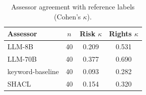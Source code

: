 \begin{table}[htbp]
\centering
\caption{Assessor agreement with reference labels (Cohen's $\kappa$).}
\label{tab:assessor_vs_gt}
\begin{tabular}{lccc}
\toprule
Assessor & $n$ & Risk $\kappa$ & Rights $\kappa$ \\
\midrule
LLM-8B & 40 & 0.209 & 0.531 \\
LLM-70B & 40 & 0.377 & 0.690 \\
keyword-baseline & 40 & 0.093 & 0.282 \\
SHACL & 40 & 0.154 & 0.320 \\
\bottomrule
\end{tabular}
\end{table}
